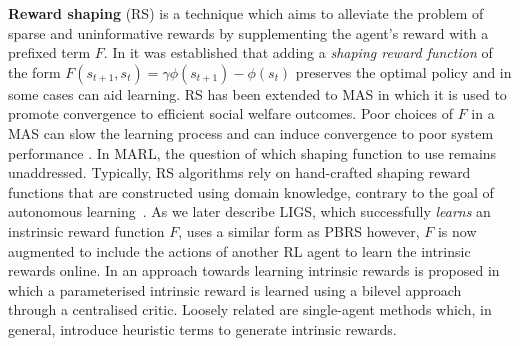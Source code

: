 \documentclass{article}
\begin{document}
% 
%   
\textbf{Reward shaping} \cite{harutyunyan2015expressing} (RS) is a technique which aims to alleviate the problem of sparse and uninformative rewards by supplementing the agent's reward with a prefixed term $F$. 
In \cite{ng1999policy} it was established that adding a \textit{shaping reward function} of the form $F(s_{t+1},s_{t})=\gamma\phi(s_{t+1})-\phi(s_t)$ preserves the optimal policy and in some cases can aid learning. 
% 
RS has been extended to MAS \cite{devlin2011empirical,mannion2018reward,devlin2011theoretical, devlin2012dynamic, devlin2016plan,sadeghlou2014dynamic} in which it is used to promote convergence to efficient social welfare outcomes. 
Poor choices of $F$ in a MAS can slow the learning process and 
can induce convergence to poor system performance \cite{devlin2011theoretical}. In MARL, the question of which shaping function to use remains unaddressed.
Typically, RS algorithms rely on hand-crafted shaping reward functions that are constructed using domain knowledge, contrary to the goal of autonomous learning~\cite{devlin2011theoretical}. As we later describe LIGS, which successfully \textit{learns} an instrinsic reward function $F$, uses a similar form as PBRS however, $F$ is now augmented to include the actions of another RL agent to learn the intrinsic rewards online. In \cite{du2019liir} an approach towards learning intrinsic rewards is proposed in which a parameterised intrinsic reward is learned using a bilevel approach through a centralised critic. Loosely related are single-agent methods \cite{zheng2018learning, dilokthanakul2019feature, kulkarni2016hierarchical, pathak2017curiosity} which, in general, introduce heuristic terms to generate intrinsic rewards. 
\end{document}

